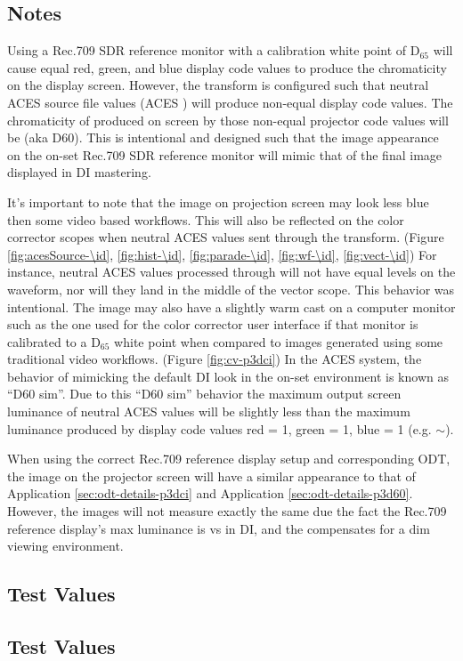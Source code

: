 \subsection{Notes}
\label{subsec:notes-\id}

Using a Rec.709 SDR reference monitor with a calibration white point of D$_{65}$ will cause equal red, green, and blue display code values to produce the chromaticity  on the display screen. However, the \transformID{} transform is configured such that neutral ACES source file values (ACES \rgbequal) will produce non-equal display code values. The chromaticity of produced on screen by those non-equal projector code values will be  (aka D60).  This is intentional and designed such that the image appearance on the on-set Rec.709 SDR reference monitor will mimic that of the final image displayed in DI mastering.

It's important to note that the image on projection screen may look less blue then some video based workflows. This will also be reflected on the color corrector scopes when neutral ACES values sent through the \transformID{} transform. (Figure \ref{fig:acesSource-\id}, \ref{fig:hist-\id}, \ref{fig:parade-\id}, \ref{fig:wf-\id}, \ref{fig:vect-\id}) For instance, neutral ACES values processed through \transformID{} will not have equal levels on the waveform, nor will they land in the middle of the vector scope. This behavior was intentional. The image may also have a slightly warm cast on a computer monitor such as the one used for the color corrector user interface if that monitor is calibrated to a D$_{65}$ white point when compared to images generated using some traditional video workflows. (Figure \ref{fig:cv-p3dci}) In the ACES system, the behavior of mimicking the default DI look in the on-set environment is known as ``D60 sim''. Due to this ``D60 sim'' behavior the maximum output screen luminance of neutral ACES values will be slightly less than the maximum luminance produced by display code values red = 1, green = 1, blue = 1 (e.g. $\mathtt{\sim}$).

When using the correct Rec.709 reference display setup and corresponding ODT, the image on the projector screen will have a similar appearance to that of Application \ref{sec:odt-details-p3dci} and Application \ref{sec:odt-details-p3d60}.  However, the images will not measure exactly the same due the fact the Rec.709 reference display's max luminance is  vs  in DI, and the \transformID{} compensates for a dim viewing environment.


\subsection{Test Values}
\label{subsec:testValues-\id}

\testValuesSubSec{}

\subsection{Test Values}
\label{subsec:testValues-\id}

\testValuesSubSec{}